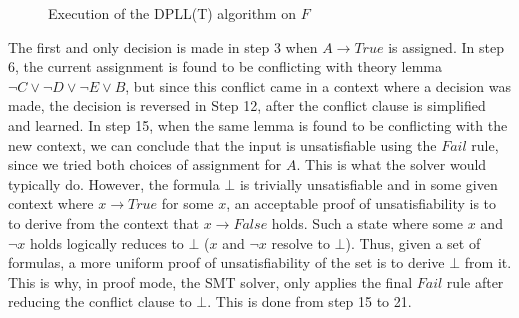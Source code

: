 \documentclass{article}
\begin{document}
\begin{figure}[t]
\begin{center}
	\end{center}
	\caption{Execution of the DPLL(T) algorithm on $F$}
	\label{fig:dplltex}
	\end{figure}
	The first and only decision is made in 
	step 3 when $A \to True$ is assigned.
	In step 6, the current assignment is 
	found to be conflicting with theory
	lemma $\neg C \lor \neg D \lor \neg E
	\lor B$, but since this conflict 
	came in a context where a decision
	was made, the decision is reversed
	in Step 12, after the conflict clause 
	is simplified and learned. In step 15, 
	when the same lemma is found to be 
	conflicting with the new context, we 
	can conclude that the input is 
	unsatisfiable using the $Fail$ rule, 
	since we tried both choices of 
	assignment for $A$. This is what 
	the solver would typically do. However, 
	the formula $\bot$ 
	is trivially unsatisfiable and in 
	some given context where 
	$x \to True$ for some $x$, an 
	acceptable proof of unsatisfiability 
	is to to derive from the context that 
	$x \to False$ holds. Such a state 
	where some $x$ and $\neg x$ holds
	logically reduces to $\bot$ 
	($x$ and $\neg x$ resolve to $\bot$).
	Thus, given a set of formulas,
	a more uniform proof of 
	unsatisfiability of the set is 
	to derive $\bot$ from it. This is why, 
	in proof mode, the SMT solver, only 
	applies the final $Fail$ rule after 
	reducing the conflict clause to $\bot$. 
	This is done from step 15 to 21.
	
\end{document}
